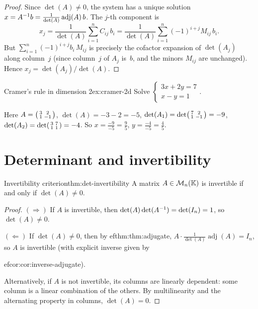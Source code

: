 \begin{proof}
Since $\det(A)\neq 0$, the system has a unique solution
$x = {A}^{-1}b = \frac{1}{\det(A)}\operatorname{adj}(A)\,b$.
The $j$-th component is
\[
  x_j = \frac{1}{\det(A)}\sum_{i=1}^n C_{ij}\,b_i
  = \frac{1}{\det(A)}\sum_{i=1}^n (-1)^{i+j}M_{ij}\,b_i.
\]
But $\sum_{i=1}^n (-1)^{i+j}b_i\,M_{ij}$ is precisely the cofactor
expansion of $\det(A_j)$ along column~$j$ (since column~$j$ of $A_j$
is~$b$, and the minors $M_{ij}$ are unchanged). Hence
$x_j = \det(A_j)/\det(A)$.
\end{proof}

\begin{example}{Cramer's rule in dimension 2}{ex:cramer-2d}
Solve $\begin{cases} 3x+2y=7 \\ x-y=1\end{cases}$.

Here $A=\begin{psmallmatrix}3&2\\1&-1\end{psmallmatrix}$,
$\det(A)=-3-2=-5$,
$\det(A_1)=\det\begin{psmallmatrix}7&2\\1&-1\end{psmallmatrix}=-9$,
$\det(A_2)=\det\begin{psmallmatrix}3&7\\1&1\end{psmallmatrix}=-4$.
So $x = \frac{-9}{-5}=\frac{9}{5}$,
$y=\frac{-4}{-5}=\frac{4}{5}$.
\end{example}


\section{Determinant and invertibility}\label{sec:det-invertibility}

\begin{theorem}{Invertibility criterion}{thm:det-invertibility}
A matrix $A\in\mathcal{M}_n({\mathbb{K}})$ is invertible if and only if $\det(A)\neq 0$.
\end{theorem}

\begin{proof}
$(\Rightarrow)$\; If $A$ is invertible, then
$\det(A)\det({A}^{-1})=\det(I_n)=1$, so $\det(A)\neq 0$.

$(\Leftarrow)$\; If $\det(A)\neq 0$, then by 
ef{thm:thm:adjugate},
$A\cdot\frac{1}{\det(A)}\operatorname{adj}(A) = I_n$,
so $A$ is invertible (with explicit inverse given by

ef{cor:cor:inverse-adjugate}).

Alternatively, if $A$ is not invertible, its columns are linearly
dependent: some column is a linear combination of the others. By
multilinearity and the alternating property in columns,
$\det(A)=0$.
\end{proof}

